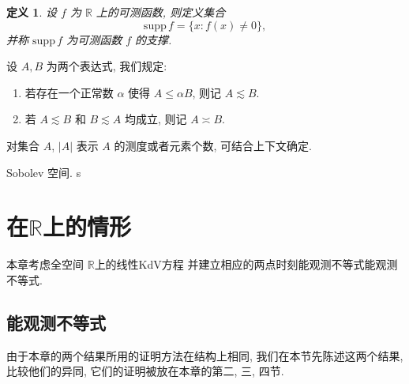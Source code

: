 \documentclass[master]{cugthesis}
\newcommand\R{\ensuremath{\mathbb{R}}}
\newtheorem{definition}{定义}[chapter]
\begin{document}
    \begin{definition}
    设 $f$ 为 $\R$ 上的可测函数, 则定义集合
    \begin{equation*}
        \mathrm{supp}\, f= \lbrace x: f(x)\neq 0 \rbrace,
    \end{equation*}
    并称 $\mathrm{supp}\, f$ 为可测函数 $f$ 的支撑.
    \end{definition}
    
    设 $A, B$ 为两个表达式, 我们规定:
    \begin{enumerate}
        \item 若存在一个正常数 $\alpha$ 使得 $A\le \alpha B$, 则记 $A\lesssim B$.
        \item 若 $A\lesssim B$ 和 $B\lesssim A$ 均成立, 则记 $A\asymp B$.
    \end{enumerate}
    
    对集合 $A$, $|A|$ 表示 $A$ 的测度或者元素个数, 可结合上下文确定. 
    
    Sobolev 空间. s
    


    \chapter{在$\R$上的情形}
    本章考虑全空间 $\R $上的线性KdV方程
    并建立相应的两点时刻能观测不等式能观测不等式. 
    \section{能观测不等式}
  由于本章的两个结果所用的证明方法在结构上相同, 我们在本节先陈述这两个结果, 比较他们的异同, 它们的证明被放在本章的第二, 三, 四节. 
  
\end{document}
